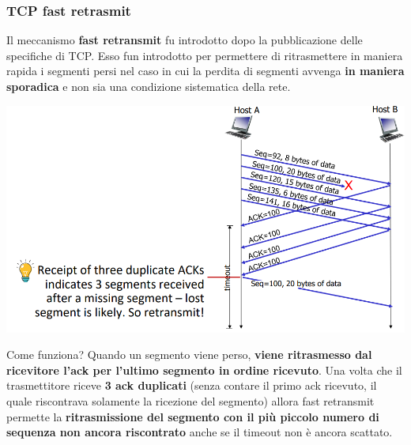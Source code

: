 \documentclass[12pt]{article}
\begin{document}
\subsubsection{TCP fast retrasmit}
Il meccanismo \textbf{fast retransmit} fu introdotto dopo la pubblicazione delle specifiche di TCP. Esso fun introdotto per permettere di ritrasmettere in maniera rapida i segmenti persi
nel caso in cui la perdita di segmenti avvenga \textbf{in maniera sporadica} e non sia una condizione sistematica della rete.
\begin{center}
    \includegraphics[width = 0.85\linewidth]{Images/60.png}
\end{center}
Come funziona? Quando un segmento viene perso, \textbf{viene ritrasmesso dal ricevitore l'ack per l'ultimo segmento in ordine ricevuto}. Una volta che il trasmettitore riceve \textbf{3 ack duplicati} (senza contare il primo ack ricevuto, il quale riscontrava solamente la ricezione del segmento)
allora fast retransmit permette la \textbf{ritrasmissione del segmento con il più piccolo numero di sequenza non ancora riscontrato} anche se il timeout non è ancora scattato.
\end{document}
